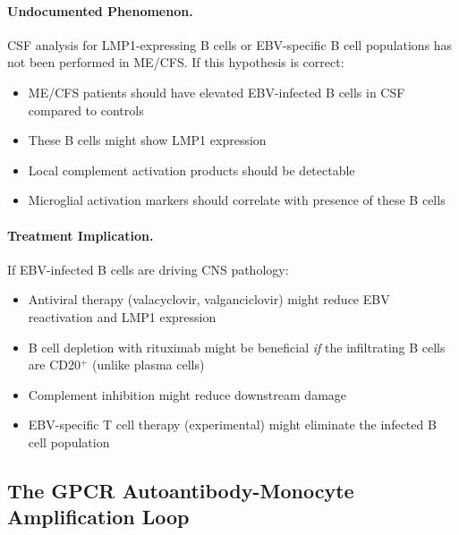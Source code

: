 \paragraph{Undocumented Phenomenon.} CSF analysis for LMP1-expressing B cells or EBV-specific B cell populations has not been performed in ME/CFS. If this hypothesis is correct:
\begin{itemize}
    \item ME/CFS patients should have elevated EBV-infected B cells in CSF compared to controls
    \item These B cells might show LMP1 expression
    \item Local complement activation products should be detectable
    \item Microglial activation markers should correlate with presence of these B cells
\end{itemize}

\paragraph{Treatment Implication.} If EBV-infected B cells are driving CNS pathology:
\begin{itemize}
    \item Antiviral therapy (valacyclovir, valganciclovir) might reduce EBV reactivation and LMP1 expression
    \item B cell depletion with rituximab might be beneficial \textit{if} the infiltrating B cells are CD20$^+$ (unlike plasma cells)
    \item Complement inhibition might reduce downstream damage
    \item EBV-specific T cell therapy (experimental) might eliminate the infected B cell population
\end{itemize}

\subsection{The GPCR Autoantibody-Monocyte Amplification Loop}

